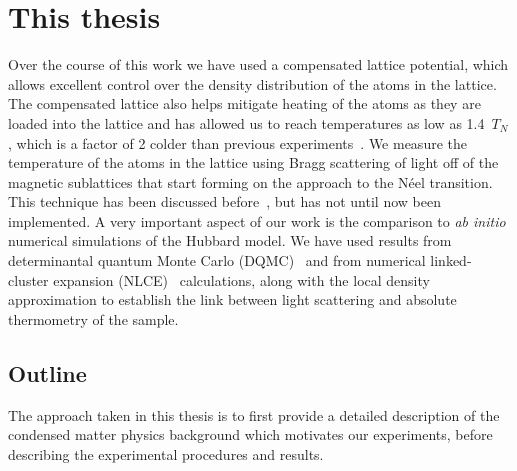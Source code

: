 \section{This thesis}

Over the course of this work we have used a compensated lattice potential,
which allows excellent control over the density distribution of the atoms in
the lattice.  The compensated lattice also helps mitigate heating of the atoms
as they are loaded into the lattice and has allowed us to reach temperatures as
low as 1.4~$T_{N}$, which is a factor of 2 colder than previous
experiments~\cite{Imriska2014}.  We measure the temperature of the atoms in the
lattice using Bragg scattering of light off of the magnetic sublattices that
start forming on the approach to the N\'{e}el transition.  This technique has
been discussed before~\cite{Ted2010}, but has not until now been implemented.
A very important aspect of our work is the comparison to \textit{ab initio}
numerical simulations of the Hubbard model.   We have used results from
determinantal quantum Monte Carlo (DQMC)~\cite{Paiva2011} and from numerical
linked-cluster expansion (NLCE)~\cite{Rigol2006} calculations,  along with the
local density approximation to establish the link between light scattering and
absolute thermometry of the sample. 

\subsection{Outline}

The approach taken in this thesis is to first provide a detailed description of
the condensed matter physics background which motivates our experiments, before
describing the experimental procedures and results.    

